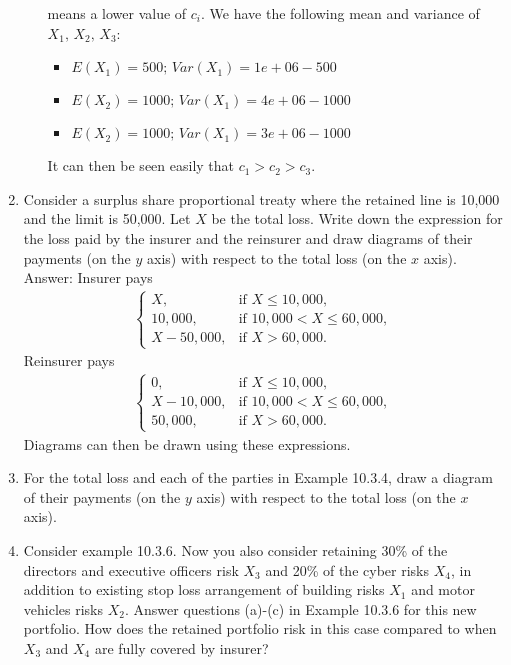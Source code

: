 \documentclass[11pt,a4paper,onecolumn]{article}
\begin{document}
\begin{enumerate}
\begin{enumerate}
	means a lower value of $c_i$. We have the following mean and variance of $X_1,\,X_2,\,X_3$:
	\begin{itemize}
		\item $E(X_1)=500;\,Var(X_1)=1e+06-500$
		\item $E(X_2)=1000;\,Var(X_1)=4e+06-1000$
		\item $E(X_2)=1000;\,Var(X_1)=3e+06-1000$
	\end{itemize}
It can then be seen easily that $c_1>c_2>c_3$.
\end{enumerate}

\item Consider a surplus share proportional treaty where the retained line is 10,000 and the limit is 50,000. Let $X$  be the total loss. Write down the expression for the loss paid by the insurer and the reinsurer and draw diagrams of their payments (on the $y$ axis) with respect to the total loss (on the $x$ axis).\\
Answer: Insurer pays
\begin{align*}
\begin{cases}
X, & \text{if }X\leq 10,000,\\
10,000, & \text{if }10,000<X\leq 60,000,\\
X-50,000, & \text{if } X>60,000.
\end{cases}
\end{align*}
Reinsurer pays
\begin{align*}
\begin{cases}
0, & \text{if }X\leq 10,000,\\
X-10,000, & \text{if }10,000<X\leq 60,000,\\
50,000, & \text{if } X>60,000.
\end{cases}
\end{align*}
Diagrams can then be drawn using these expressions.
\item For the total loss and each of the parties in Example 10.3.4, draw a diagram of their payments (on the $y$ axis) with respect to the total loss (on the $x$ axis).
\item  Consider example 10.3.6. Now you also consider retaining 30\% of the directors and executive officers risk $X_3$ and 20\% of the cyber risks $X_4$, in addition to existing stop loss arrangement of building risks $X_1$ and motor vehicles risks $X_2$. Answer questions (a)-(c) in Example 10.3.6 for this new portfolio. How does the retained portfolio risk in this case compared to when $X_3$ and $X_4$ are fully covered by insurer? \\

\end{enumerate}
\end{document}

